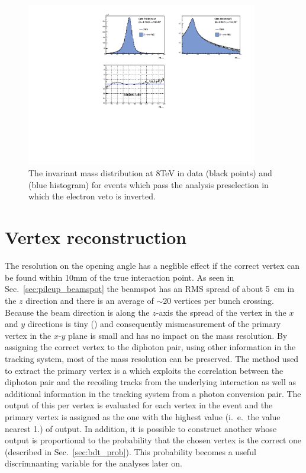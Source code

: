 \begin{figure}
  \includegraphics[width=0.9\textwidth]{ch3_comm_anal_comps/plots/smearing_mass_Zee_8TeV.pdf}
  \caption{The \Zee invariant mass distribution at 8TeV in data (black points) and \MC (blue histogram) for events which pass the analysis preselection in which the electron veto is inverted.}
  \label{fig:scale_smearing_analysis_8TeV}
\end{figure}

\section{Vertex reconstruction}
\label{sec:vtx_reco}

The resolution on the opening angle has a neglible effect if the correct vertex can be found within 10mm of the true interaction point. As seen in Sec.~\ref{sec:pileup_beamspot} the beamspot has an RMS spread of about 5~cm in the $z$ direction and there is an average of $\sim20$ vertices per bunch crossing. Because the beam direction is along the $z$-axis the spread of the vertex in the $x$ and $y$ directions is tiny () and consequently mismeasurement of the primary vertex in the $x$-$y$ plane is small and has no impact on the mass resolution. By assigning the correct vertex to the diphoton pair, using other information in the tracking system, most of the mass resolution can be preserved. The method used to extract the primary vertex is a \BDT which exploits the correlation between the diphoton pair and the recoiling tracks from the underlying interaction as well as additional information in the tracking system from a photon conversion pair. The output of this per vertex \BDT is evaluated for each vertex in the event and the primary vertex is assigned as the one with the highest value (i.~e.~the value nearest 1.) of \BDT output. In addition, it is possible to construct another \BDT whose output is proportional to the probability that the chosen vertex is the correct one (described in Sec.~\ref{sec:bdt_prob}). This probability becomes a useful discrimnanting variable for the analyses later on.

